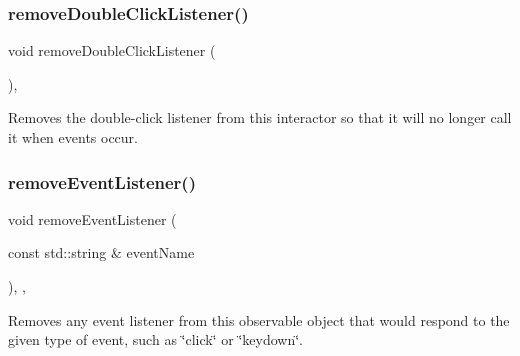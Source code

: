 \mbox{\label{classGInteractor_aa4250907e4cdd77349c04f0cf5cdd3d3}} 
\subsubsection{\texorpdfstring{remove\+Double\+Click\+Listener()}{removeDoubleClickListener()}}
{\footnotesize\ttfamily void remove\+Double\+Click\+Listener (\begin{DoxyParamCaption}{ }\end{DoxyParamCaption})\hspace{0.3cm}{\ttfamily [virtual]}, {\ttfamily [inherited]}}



Removes the double-\/click listener from this interactor so that it will no longer call it when events occur. 

\mbox{\label{classGObservable_acbcf1ed3a851ad8a3c17ef38d86b481d}} 
\subsubsection{\texorpdfstring{remove\+Event\+Listener()}{removeEventListener()}}
{\footnotesize\ttfamily void remove\+Event\+Listener (\begin{DoxyParamCaption}\item[{const std\+::string \&}]{event\+Name }\end{DoxyParamCaption})\hspace{0.3cm}{\ttfamily [protected]}, {\ttfamily [virtual]}, {\ttfamily [inherited]}}



Removes any event listener from this observable object that would respond to the given type of event, such as \char`\"{}click\char`\"{} or \char`\"{}keydown\char`\"{}. 

\mbox{\label{classGObservable_af51cc35c29a1bd1908609d432decdbb6}} 
